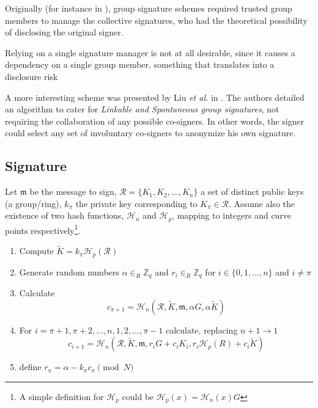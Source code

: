 Originally (for instance in \cite{Chaum:1991:GS:1754868.1754897}), group  signature schemes required trusted group members to manage the collective signatures, who had the theoretical possibility of disclosing the original signer.

Relying on a single signature manager is not at all desirable, since it causes a dependency on a single group member, something that
translates into a disclosure risk

A more interesting scheme was presented by  Liu {\em et al.} in \cite{Liu2004}. The authors detailed an algorithm to cater for {\em Linkable and Spontaneous group signatures}, not requiring the collaboration of any possible co-signers.
In other words, the signer could select any set of involuntary co-signers to anonymize his own signature. 


\subsection*{Signature}

Let \(\mathfrak{m}\) be the message to sign, \(\mathcal{R} = \{K_1, K_2, ..., K_n\}\) a set of distinct public keys (a group/ring), \(k_\pi\) the private key corresponding to \(K_\pi \in \mathcal{R}\). Assume also the existence of two hash functions, \(\mathcal{H}_n\) and \(\mathcal{H}_p\),
mapping to integers and curve points respectively\footnote{ 
	A simple definition for \(\mathcal{H}_p\) 
	could be \(\mathcal{H}_p(x) = \mathcal{H}_n(x) G\)
}.

\begin{enumerate}
	\item Compute \(\tilde{K} = k_\pi \mathcal{H}_p(\mathcal{R})\)
	
	\item Generate random numbers \(\alpha \in_R \mathbb{Z}_q\) and  \(r_i \in_R \mathbb{Z}_q\) for \(i \in \{0, 1, ..., n\}\) and \(i \ne \pi\)
	
	\item Calculate
	\[c_{\pi+1} = \mathcal{H}_n(\mathcal{R}, \tilde{K}, \mathfrak{m}, \alpha G, \alpha \tilde{K} )\]
	
	\item For \(i = \pi+1, \pi+2, ..., n, 1, 2, ..., \pi-1\) calculate, replacing \(n + 1 \rightarrow 1\)
	\[  c_{i+1} = \mathcal{H}_n(\mathcal{R}, \tilde{K}, \mathfrak{m}, r_i G + c_i K_i, r_i \mathcal{H}_p(R) + c_i \tilde{K} )  \] 
	
	
	\item define \(r_\pi = \alpha -k_\pi c_\pi \pmod N\)
	
\end{enumerate}

